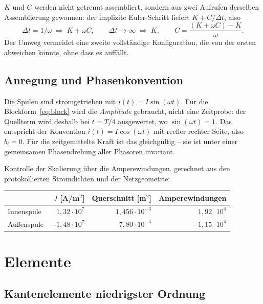 \documentclass[11pt,a4paper]{article}
\begin{document}
$K$ und $C$ werden nicht getrennt assembliert, sondern aus zwei Aufrufen
derselben Assemblierung gewonnen: der implizite Euler-Schritt liefert
$K + C/\Delta t$, also
\begin{equation}
  \Delta t = 1/\omega \;\Rightarrow\; K + \omega C,
  \qquad
  \Delta t \to \infty \;\Rightarrow\; K,
  \qquad
  C = \frac{(K+\omega C) - K}{\omega}.
\end{equation}
Der Umweg vermeidet eine zweite vollständige Konfiguration, die von der ersten
abweichen könnte, ohne dass es auffällt.

\subsection{Anregung und Phasenkonvention}

Die Spulen sind stromgetrieben mit $i(t) = I\sin(\omega t)$. Für die
Blockform~\eqref{eq:block} wird die \emph{Amplitude} gebraucht, nicht eine
Zeitprobe: der Quellterm wird deshalb bei $t = T/4$ ausgewertet, wo
$\sin(\omega t) = 1$. Das entspricht der Konvention $i(t) = I\cos(\omega t)$
mit reeller rechter Seite, also $b_i = 0$. Für die zeitgemittelte Kraft ist
das gleichgültig -- sie ist unter einer gemeinsamen Phasendrehung aller
Phasoren invariant.

Kontrolle der Skalierung über die Amperewindungen, gerechnet aus den
protokollierten Stromdichten und der Netzgeometrie:

\begin{center}
\begin{tabular}{lrrr}
\toprule
& $J$ [A/m$^2$] & Querschnitt [m$^2$] & Amperewindungen \\
\midrule
Innenspule  & $1{,}32\cdot 10^{7}$  & $1{,}456\cdot 10^{-3}$ & $1{,}92\cdot 10^{4}$ \\
Außenspule  & $-1{,}48\cdot 10^{7}$ & $7{,}80\cdot 10^{-4}$  & $-1{,}15\cdot 10^{4}$ \\
\bottomrule
\end{tabular}
\end{center}

\section{Elemente}
\label{sec:elem}

\subsection{Kantenelemente niedrigster Ordnung}
\end{document}
